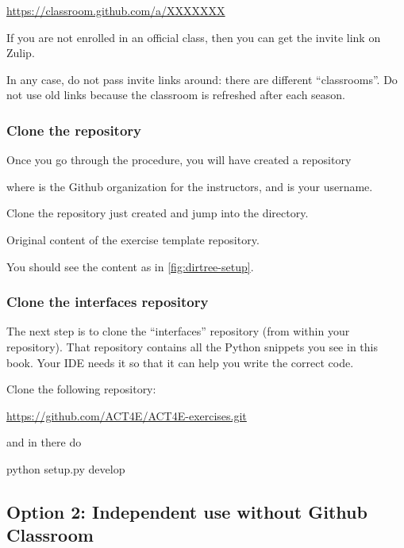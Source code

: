 \url{https://classroom.github.com/a/XXXXXXX}

If you are not enrolled in an official class, then you can get the invite link on Zulip.

In any case, do not pass invite links around: there are different ``classrooms''.
Do not use old links because the classroom is refreshed after each season.

\subsubsection{Clone the repository}

Once you go through the procedure, you will have created a repository

\begin{quote}
\end{quote}
where  is the Github organization for the instructors, and  is your username.

Clone the repository just created and jump into the directory.

\begin{marginfigure}
  \caption{Original content of the exercise template repository.}
  \label{fig:dirtree-setup}
\end{marginfigure}

You should see the content as in \cref{fig:dirtree-setup}.

\subsubsection{Clone the interfaces repository}

The next step is to clone the ``interfaces'' repository (from within your repository).
That repository contains all the Python snippets you see in this book.
Your IDE needs it so that it can help you write the correct code.

Clone the following repository:

\url{https://github.com/ACT4E/ACT4E-exercises.git}

and in there do

\begin{console}
  python setup.py develop
\end{console}

\subsection{Option 2: Independent use without Github Classroom}
\label{sub:without-classroom}

